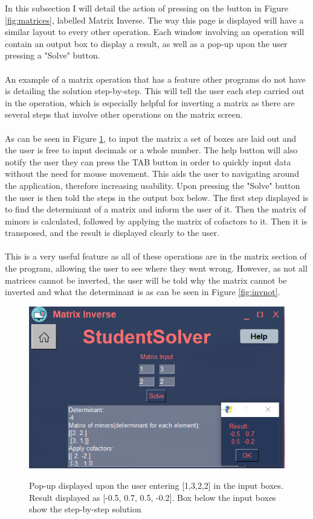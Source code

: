 \documentclass[final]{cmpreport}
\begin{document}
	In this subsection I will detail the action of pressing on the button in Figure \ref{fig:matrices}, labelled Matrix Inverse. The way this page is displayed will have a similar layout to every other operation. Each window involving an operation will contain an output box to display a result, as well as a pop-up upon the user pressing a "Solve" button.\\
	\\An example of a matrix operation that has a feature other programs do not have is detailing the solution step-by-step. This will tell the user each step carried out in the operation, which is especially helpful for inverting a matrix as there are several steps that involve other operations on the matrix screen.\\
	\\As can be seen in Figure \ref{fig:inv}, to input the matrix a set of boxes are laid out and the user is free to input decimals or a whole number. The help button will also notify the user they can press the TAB button in order to quickly input data without the need for mouse movement. This aids the user to navigating around the application, therefore increasing usability. Upon pressing the "Solve" button the user is then told the steps in the output box below. The first step displayed is to find the determinant  of a matrix and inform the user of it. Then the matrix of minors is calculated, followed by applying the matrix of cofactors to it. Then it is transposed, and the result is displayed clearly to the user.\\
	\\This is a very useful feature as all of these operations are in the matrix section of the program, allowing the user to see where they went wrong. However, as not all matrices cannot be inverted, the user will be told why the matrix cannot be inverted and what the determinant is as can be seen in Figure \ref{fig:invnot}.
	
	\begin{figure}[H]
		\caption{Pop-up displayed upon the user entering [1,3,2,2] in the input boxes. Result displayed as [-0.5, 0.7, 0.5, -0.2]. Box below the input boxes show the step-by-step solution}
		\centering
		\includegraphics[scale=1]{invert.png}
		\label{fig:inv}
	\end{figure}
	
\end{document}
